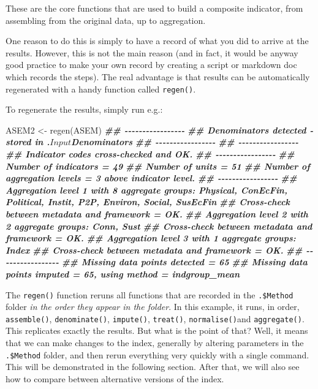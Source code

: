 \documentclass[
]{book}
\newenvironment{Shaded}{\begin{snugshade}}{\end{snugshade}}
\newcommand{\DocumentationTok}[1]{\textcolor[rgb]{0.56,0.35,0.01}{\textbf{\textit{#1}}}}
\newcommand{\FunctionTok}[1]{\textcolor[rgb]{0.00,0.00,0.00}{#1}}
\newcommand{\NormalTok}[1]{#1}
\newcommand{\OtherTok}[1]{\textcolor[rgb]{0.56,0.35,0.01}{#1}}
\begin{document}
These are the core functions that are used to build a composite indicator, from assembling from the original data, up to aggregation.

One reason to do this is simply to have a record of what you did to arrive at the results. However, this is not the main reason (and in fact, it would be anyway good practice to make your own record by creating a script or markdown doc which records the steps). The real advantage is that results can be automatically regenerated with a handy function called \texttt{regen()}.

To regenerate the results, simply run e.g.:

\begin{Shaded}
\begin{Highlighting}[]
\NormalTok{ASEM2 }\OtherTok{\textless{}{-}} \FunctionTok{regen}\NormalTok{(ASEM)}
\DocumentationTok{\#\# {-}{-}{-}{-}{-}{-}{-}{-}{-}{-}{-}{-}{-}{-}{-}{-}{-}}
\DocumentationTok{\#\# Denominators detected {-} stored in .$Input$Denominators}
\DocumentationTok{\#\# {-}{-}{-}{-}{-}{-}{-}{-}{-}{-}{-}{-}{-}{-}{-}{-}{-}}
\DocumentationTok{\#\# {-}{-}{-}{-}{-}{-}{-}{-}{-}{-}{-}{-}{-}{-}{-}{-}{-}}
\DocumentationTok{\#\# Indicator codes cross{-}checked and OK.}
\DocumentationTok{\#\# {-}{-}{-}{-}{-}{-}{-}{-}{-}{-}{-}{-}{-}{-}{-}{-}{-}}
\DocumentationTok{\#\# Number of indicators = 49}
\DocumentationTok{\#\# Number of units = 51}
\DocumentationTok{\#\# Number of aggregation levels = 3 above indicator level.}
\DocumentationTok{\#\# {-}{-}{-}{-}{-}{-}{-}{-}{-}{-}{-}{-}{-}{-}{-}{-}{-}}
\DocumentationTok{\#\# Aggregation level 1 with 8 aggregate groups: Physical, ConEcFin, Political, Instit, P2P, Environ, Social, SusEcFin}
\DocumentationTok{\#\# Cross{-}check between metadata and framework = OK.}
\DocumentationTok{\#\# Aggregation level 2 with 2 aggregate groups: Conn, Sust}
\DocumentationTok{\#\# Cross{-}check between metadata and framework = OK.}
\DocumentationTok{\#\# Aggregation level 3 with 1 aggregate groups: Index}
\DocumentationTok{\#\# Cross{-}check between metadata and framework = OK.}
\DocumentationTok{\#\# {-}{-}{-}{-}{-}{-}{-}{-}{-}{-}{-}{-}{-}{-}{-}{-}{-}}
\DocumentationTok{\#\# Missing data points detected = 65}
\DocumentationTok{\#\# Missing data points imputed = 65, using method = indgroup\_mean}
\end{Highlighting}
\end{Shaded}

The \texttt{regen()} function reruns all functions that are recorded in the \texttt{.\$Method} folder \emph{in the order they appear in the folder}. In this example, it runs, in order, \texttt{assemble()}, \texttt{denominate()}, \texttt{impute()}, \texttt{treat()}, \texttt{normalise()}and \texttt{aggregate()}. This replicates exactly the results. But what is the point of that? Well, it means that we can make changes to the index, generally by altering parameters in the \texttt{.\$Method} folder, and then rerun everything very quickly with a single command. This will be demonstrated in the following section. After that, we will also see how to compare between alternative versions of the index.
\end{document}
